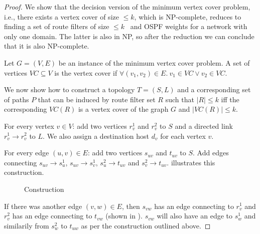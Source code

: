 \begin{proof}
We show that the decision version of the minimum 
vertex cover problem, i.e., there exists a vertex cover
of size $ \leq k$, which is NP-complete, 
reduces to finding a set of route filters of size $ \leq k$ \
and OSPF weights for a network with only one domain. 
The latter is also in NP, so after the reduction we 
can conclude that it is also NP-complete.

Let $G = (V,E)$ be an instance of the 
minimum vertex cover problem. A set of
vertices $VC \subseteq V$ is the vertex cover
if $\forall (v_1, v_2) \in E. ~v_1 \in VC \vee v_2 \in VC$. 

We now show how to construct a topology $T=(S,L)$ 
and a corresponding set of paths $P$ that can be 
induced by route filter set $R$ such that $|R| \leq k$  
iff the corresponding $VC(R)$ is a vertex cover of 
the graph $G$ and $|VC(R)| \leq k$.

For every vertex $v \in V$: add two vertices $r_v^1$ 
and $r_v^2$ to $S$ and a directed link $r_v^1 \rightarrow r_v^2$ to $L$. 
We also assign a destination host $d_v$ for each vertex $v$. 

For every edge $(u,v) \in E$: add two vertices $s_{uv}$
and $t_{uv}$ to $S$. Add edges
connecting $s_{uv} \rightarrow s_{u}^1$, $s_{uv} \rightarrow s_{v}^1$,
$s_{u}^2 \rightarrow t_{uv}$ and $s_{v}^2 \rightarrow t_{uv}$.  illustrates this construction.
\begin{figure}[H]
	\centering
	\caption{Construction}
	\label{fig:rfcomplexity}
\end{figure}
If there was another edge $(v,w) \in E$, then
$s_{vw}$ has an edge connecting to $r_v^1$ and
$r_v^2$ has an edge connecting to $t_{vw}$ (shown
in ). $s_{vw}$ will also 
have an edge to $s_w^1$ and similarily from $s_w^2$ to $t_{uw}$
as per the construction outlined above.


\end{proof}
